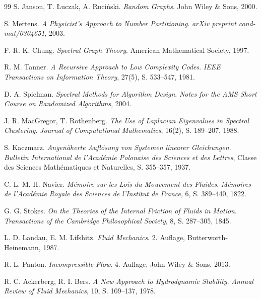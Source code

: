 \documentclass[a4paper,12pt]{article}
\theoremstyle{definition}
\begin{document}
\begin{thebibliography}{99}
 S. Janson, T. Łuczak, A. Ruciński. \textit{Random Graphs}. John Wiley \& Sons, 2000.

 S. Mertens. \textit{A Physicist's Approach to Number Partitioning}. \textit{arXiv preprint cond-mat/0304651}, 2003.


 F. R. K. Chung. \textit{Spectral Graph Theory}. American Mathematical Society, 1997.

 R. M. Tanner. \textit{A Recursive Approach to Low Complexity Codes}. \textit{IEEE Transactions on Information Theory}, 27(5), S. 533--547, 1981.

 D. A. Spielman. \textit{Spectral Methods for Algorithm Design}. \textit{Notes for the AMS Short Course on Randomized Algorithms}, 2004.

 J. R. MacGregor, T. Rothenberg. \textit{The Use of Laplacian Eigenvalues in Spectral Clustering}. \textit{Journal of Computational Mathematics}, 16(2), S. 189--207, 1988.

 S. Kaczmarz. \textit{Angenäherte Auflösung von Systemen linearer Gleichungen}. \textit{Bulletin International de l'Académie Polonaise des Sciences et des Lettres}, Classe des Sciences Mathématiques et Naturelles, S. 355--357, 1937.


 C. L. M. H. Navier. \textit{Mémoire sur les Lois du Mouvement des Fluides}. \textit{Mémoires de l'Académie Royale des Sciences de l'Institut de France}, 6, S. 389--440, 1822.

 G. G. Stokes. \textit{On the Theories of the Internal Friction of Fluids in Motion}. \textit{Transactions of the Cambridge Philosophical Society}, 8, S. 287--305, 1845.

 L. D. Landau, E. M. Lifshitz. \textit{Fluid Mechanics}. 2. Auflage, Butterworth-Heinemann, 1987.

 R. L. Panton. \textit{Incompressible Flow}. 4. Auflage, John Wiley \& Sons, 2013.

 R. C. Ackerberg, R. I. Bers. \textit{A New Approach to Hydrodynamic Stability}. \textit{Annual Review of Fluid Mechanics}, 10, S. 109--137, 1978.



\end{thebibliography}
\end{document}
